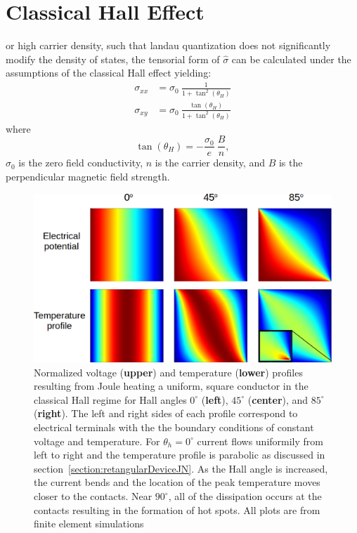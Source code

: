 \section{Classical Hall Effect}
 or high carrier density, such that landau quantization does not significantly modify the density of states, the tensorial form of $\hat\sigma$ can be calculated under the assumptions of the classical Hall effect yielding:
\begin{align}
\sigma_{xx} &= \sigma_0~\frac{1}{1+\tan^2(\theta_H)} \nonumber\\
\sigma_{xy} &= \sigma_0~\frac{\tan(\theta_H)}{1+\tan^2(\theta_H)} \label{eq:hall_sigma}
\end{align}
where
\begin{equation}
\tan(\theta_H) = -\frac{\sigma_0}{e}~\frac{B}{n},
\end{equation}
$\sigma_0$ is the zero field conductivity, $n$ is the carrier density, and $B$ is the perpendicular magnetic field strength. 
\begin{figure}
\centering
\includegraphics[width=120mm]{figures/magneto/Hall_profiles.png}
\caption{Normalized voltage (\textbf{upper}) and temperature (\textbf{lower}) profiles resulting from Joule heating a uniform, square conductor in the classical Hall regime for Hall angles $0^\circ$ (\textbf{left}), $45^\circ$ (\textbf{center}), and $85^\circ$ (\textbf{right}). The left and right sides of each profile correspond to electrical terminals with the the boundary conditions of constant voltage and temperature. For $\theta_h=0^\circ$ current flows uniformily from left to right and the temperature profile is parabolic as discussed in section~\ref{section:retangularDeviceJN}. As the Hall angle is increased, the current bends and the location of the peak temperature moves closer to the contacts. Near $90^\circ$, all of the dissipation occurs at the contacts resulting in the formation of hot spots. All plots are from finite element simulations~\cite{noauthor_comsol_2017}}
\label{fig:m_Hall_profiles}
\end{figure}

